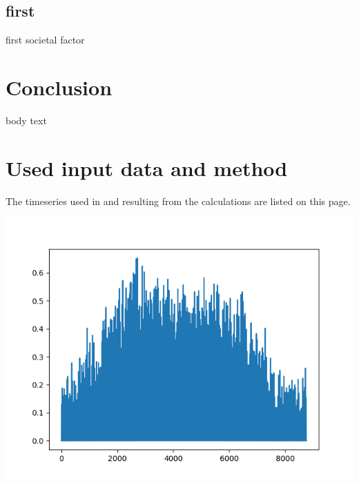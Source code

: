 \documentclass{article}
\begin{document}
\begin{multicols*}{2}
\subsection*{first}

first societal factor

\section*{Conclusion}

body text

\newpage 

\appendix

\section*{Used input data and method}

The timeseries used in and resulting from the calculations are listed on this page.

\begin{center}

\includegraphics[width=\linewidth]{per_unit_pv_generation.png}

\end{center}






\begin{center}


\end{center}
\end{multicols*}
\end{document}
